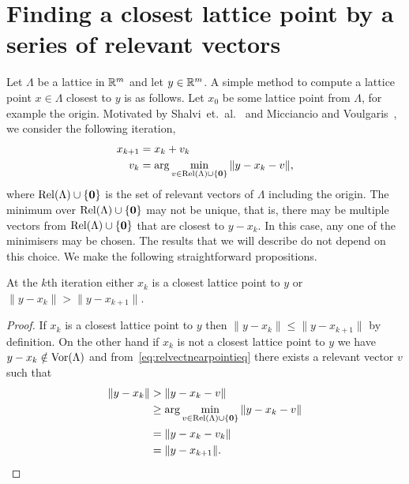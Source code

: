 \documentclass[final,leqno]{siamltex}
\begin{document}
\section{Finding a closest lattice point by a series of relevant vectors} \label{sec:iterative-slicer}

Let $\Lambda$ be a lattice in ${\mathbb R}^m$ and let $y \in {\mathbb R}^m$. A simple method to compute a lattice point $x \in \Lambda$ closest to $y$ is as follows.  Let $x_0$ be some lattice point from $\Lambda$, for example the origin.  Motivated by Shalvi~et.~al.~\cite{Shalvi_iterativeslicer_2009} and  Micciancio and Voulgaris~\cite{MicciancioVoulgaris_deterministic_jv_2013}, we consider the following iteration,
\begin{align}
x_{k+1} &= x_k + v_k \nonumber \\
v_k &= \arg\min_{ v \in \relevant(\Lambda) \cup \{\zerobf\} } \|y - x_k - v \|, \label{eq:relvectsminimslicer}
\end{align} 
where $\operatorname{Rel}(\Lambda) \cup \{\boldsymbol{0}\}$ is the set of relevant vectors of $\Lambda$ including the origin.  The minimum over $\operatorname{Rel}(\Lambda) \cup \{\boldsymbol{0}\}$ may not be unique, that is, there may be multiple vectors from $\operatorname{Rel}(\Lambda) \cup \{\boldsymbol{0}\}$ that are closest to $y - x_k$.  In this case, any one of the minimisers may be chosen.  The results that we will describe do not depend on this choice. We make the following straightforward propositions.

\begin{proposition}\label{obs:1}
At the $k$th iteration either $x_k$ is a closest lattice point to $y$ or $\|y - x_k\| > \| y - x_{k+1} \|$.
\end{proposition}
\begin{proof}
If $x_k$ is a closest lattice point to $y$ then $\|y - x_k\| \leq \| y - x_{k+1} \|$ by definition.  On the other hand if $x_k$ is not a closest lattice point to $y$ we have $y - x_k \notin \operatorname{Vor}(\Lambda)$ and from~\eqref{eq:relvectnearpointieq} there exists a relevant vector $v$ such that
\begin{align*}
\|y - x_k\| &>  \|y - x_k - v\| \\
&\geq \arg\min_{ v \in \operatorname{Rel}(\Lambda) \cup \{\boldsymbol{0}\}}\|y - x_k - v \| \\
&= \|y - x_k - v_k \| \\
&= \|y - x_{k+1}\|. 
\end{align*}
\end{proof} 
\end{document}
